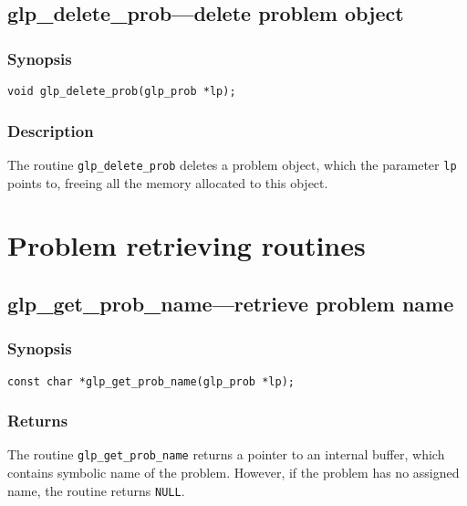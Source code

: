 \subsection{glp\_delete\_prob---delete problem object}

\subsubsection*{Synopsis}

\begin{verbatim}
void glp_delete_prob(glp_prob *lp);
\end{verbatim}

\subsubsection*{Description}

The routine \verb|glp_delete_prob| deletes a problem object, which the
parameter \verb|lp| points to, freeing all the memory allocated to this
object.


\newpage

\section{Problem retrieving routines}

\subsection{glp\_get\_prob\_name---retrieve problem name}

\subsubsection*{Synopsis}

\begin{verbatim}
const char *glp_get_prob_name(glp_prob *lp);
\end{verbatim}

\subsubsection*{Returns}

The routine \verb|glp_get_prob_name| returns a pointer to an internal
buffer, which contains symbolic name of the problem. However, if the
problem has no assigned name, the routine returns \verb|NULL|.

